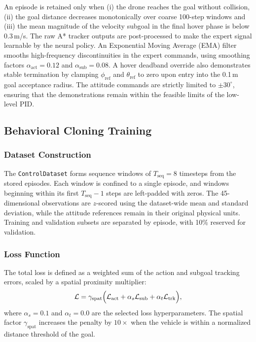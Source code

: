 \documentclass[12pt, a4paper]{article}
\begin{document}
An episode is retained only when (i) the drone reaches the goal without collision, (ii) the goal distance decreases monotonically over coarse 100-step windows and (iii) the mean magnitude of the velocity subgoal in the final hover phase is below $0.3$\,m/s.
The raw A* tracker outputs are post-processed to make the expert signal learnable by the neural policy.
An Exponential Moving Average (EMA) filter smooths high-frequency discontinuities in the expert commands, using smoothing factors $\alpha_{\mathrm{act}} = 0.12$ and $\alpha_{\mathrm{sub}} = 0.08$.
A hover deadband override also demonstrates stable termination by clamping $\phi_{\mathrm{ref}}$ and $\theta_{\mathrm{ref}}$ to zero upon entry into the 0.1\,m goal acceptance radius.
The attitude commands are strictly limited to $\pm 30^{\circ}$, ensuring that the demonstrations remain within the feasible limits of the low-level PID.

\subsection{Behavioral Cloning Training}
\label{sec:training}


\subsubsection{Dataset Construction}

The \texttt{ControlDataset} forms sequence windows of $T_{\mathrm{seq}} = 8$ timesteps from the stored episodes.
Each window is confined to a single episode, and windows beginning within its first $T_{\mathrm{seq}} - 1$ steps are left-padded with zeros.
The 45-dimensional observations are $z$-scored using the dataset-wide mean and standard deviation, while the attitude references remain in their original physical units.
Training and validation subsets are separated by episode, with 10\% reserved for validation.

\subsubsection{Loss Function}
\label{sec:loss_function}

The total loss is defined as a weighted sum of the action and subgoal tracking errors, scaled by a spatial proximity multiplier:
\begin{equation}
    \mathcal{L} = \gamma_{\mathrm{spat}} \Bigl( \mathcal{L}_{\mathrm{act}} + \alpha_s \mathcal{L}_{\mathrm{sub}} + \alpha_t \mathcal{L}_{\mathrm{trk}} \Bigr),
\end{equation}
where $\alpha_s = 0.1$ and $\alpha_t = 0.0$ are the selected loss hyperparameters.
The spatial factor $\gamma_{\mathrm{spat}}$ increases the penalty by $10\times$ when the vehicle is within a normalized distance threshold of the goal.
\end{document}
